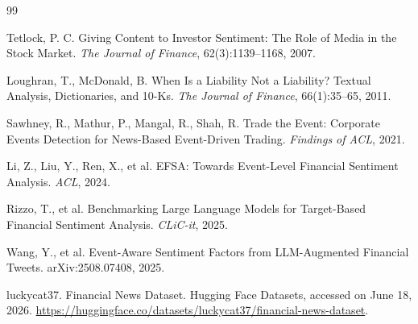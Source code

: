 \documentclass[UTF8,a4paper,10pt,twocolumn,fontset=none]{ctexart}
\begin{document}
\begin{thebibliography}{99}\scriptsize

Tetlock, P. C. Giving Content to Investor Sentiment: The Role of Media in the Stock Market.
\emph{The Journal of Finance}, 62(3):1139--1168, 2007.

Loughran, T., McDonald, B. When Is a Liability Not a Liability? Textual Analysis,
Dictionaries, and 10-Ks. \emph{The Journal of Finance}, 66(1):35--65, 2011.

Sawhney, R., Mathur, P., Mangal, R., Shah, R. Trade the Event: Corporate Events Detection
for News-Based Event-Driven Trading. \emph{Findings of ACL}, 2021.

Li, Z., Liu, Y., Ren, X., et al. EFSA: Towards Event-Level Financial Sentiment Analysis.
\emph{ACL}, 2024.

Rizzo, T., et al. Benchmarking Large Language Models for Target-Based Financial Sentiment
Analysis. \emph{CLiC-it}, 2025.

Wang, Y., et al. Event-Aware Sentiment Factors from LLM-Augmented Financial Tweets.
arXiv:2508.07408, 2025.

luckycat37. Financial News Dataset. Hugging Face Datasets, accessed on June 18, 2026.
\url{https://huggingface.co/datasets/luckycat37/financial-news-dataset}.

\end{thebibliography}
\end{document}
